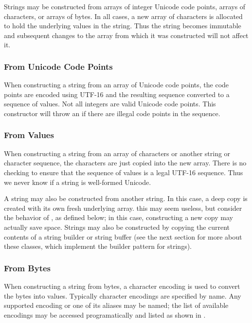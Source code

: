 Strings may be constructed from arrays of integer Unicode code points,
arrays of characters, or arrays of bytes.  In all cases, a new array
of characters is allocated to hold the underlying  values
in the string.  Thus the string becomes immutable and subsequent
changes to the array from which it was constructed will not affect it.

\subsubsection{From Unicode Code Points}

When constructing a string from an array of Unicode code points, the
code points are encoded using UTF-16 and the resulting sequence
converted to a sequence of  values.  Not all integers are
valid Unicode code points.  This constructor will throw an
 if there are illegal code points in
the sequence.

\subsubsection{From  Values}

When constructing a string from an array of characters or another
string or character sequence, the characters are just copied into the
new array.  There is no checking to ensure that the sequence of
 values is a legal UTF-16 sequence.  Thus we never know if
a string is well-formed Unicode.

A string may also be constructed from another string.  In this case, a
deep copy is created with its own fresh underlying array.  this may
seem useless, but consider the behavior of , as
defined below; in this case, constructing a new copy may actually save
space.  Strings may also be constructed by copying the current
contents of a string builder or string buffer (see the next section
for more about these classes, which implement the builder pattern for
strings).

\subsubsection{From Bytes}

When constructing a string from bytes, a character encoding is used to
convert the bytes into  values.  Typically character
encodings are specified by name.  Any supported encoding or one of its
aliases may be named; the list of available encodings may be accessed
programatically and listed as shown in .

